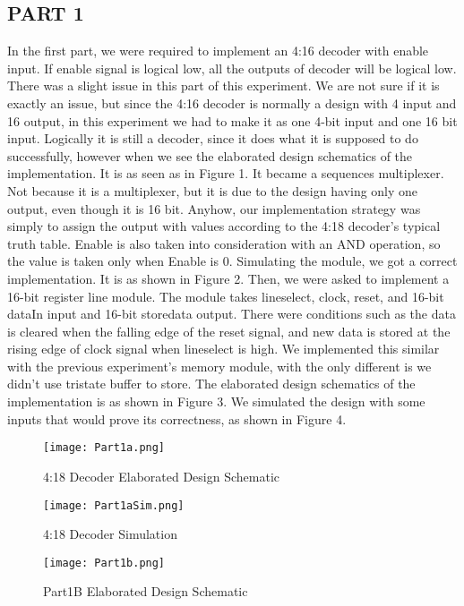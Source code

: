 \documentclass[pdftex,12pt,a4paper]{article}
\begin{document}
\subsection{PART 1}
In the first part, we were required to implement an 4:16 decoder with enable input. If enable signal is logical low, all the outputs of decoder will be logical low. There was a slight issue in this part of this experiment. We are not sure if it is exactly an issue, but since the 4:16 decoder is normally a design with 4 input and 16 output, in this experiment we had to make it as one 4-bit input and one 16 bit input. Logically it is still a decoder, since it does what it is supposed to do successfully, however when we see the elaborated design schematics of the implementation. It is as seen as in Figure 1. It became a sequences multiplexer. Not because it is a multiplexer, but it is due to the design having only one output, even though it is 16 bit. Anyhow, our implementation strategy was simply to assign the output with values according to the 4:18 decoder's typical truth table. Enable is also taken into consideration with an AND operation, so the value is taken only when Enable is 0. Simulating the module, we got a correct implementation. It is as shown in Figure 2. Then, we were asked to implement a 16-bit register line module. The module takes lineselect, clock, reset, and 16-bit dataIn input and 16-bit storedata output. There were conditions such as the data is cleared when the falling edge of the reset signal, and new data is stored at the rising edge of clock signal when lineselect is high. We implemented this similar with the previous experiment's memory module, with the only different is we didn't use tristate buffer to store. The elaborated design schematics of the implementation is as shown in Figure 3. We simulated the design with some inputs that would prove its correctness, as shown in Figure 4. 

\begin{figure}[ht]
	\centering
	\texttt{[image: Part1a.png]}
	\caption{4:18 Decoder Elaborated Design Schematic}
	\label{fig1}
\end{figure}

\begin{figure}[ht]
	\centering
	\texttt{[image: Part1aSim.png]}
	\caption{4:18 Decoder Simulation}
	\label{fig1}
\end{figure}


\begin{figure}[ht]
	\centering
	\texttt{[image: Part1b.png]}
	\caption{Part1B Elaborated Design Schematic}
	\label{fig1}
\end{figure}
\end{document}
